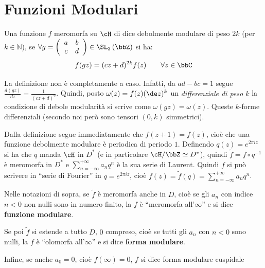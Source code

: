 \section{Funzioni Modulari}
\begin{definizione}
Una funzione $f$ meromorfa su $\cH$ di dice debolmente modulare di peso $2k$ (per $k \in \mathbb{N}$), se $\forall g =
\left( \begin{array}{cc} a & b \\ c & d \end{array} \right) \in
\SL_2 \left( \bbZ \right)$ si ha:
	\[
		f(g z) = (c z + d)^{2 k} f(z)
		\qquad \forall z \in \bbC
	\]
\end{definizione}

\begin{osservazione}
	La definizione non è completamente a caso. Infatti, da $a d - bc = 1$ segue $\displaystyle{\frac{d(gz)}{dz} = \frac{1}{(cz+d)^2}}$. Quindi, posto $\omega(z) = f(z)(\de z)^k$ un \emph{differenziale di peso $k$} la condizione di debole modularità si scrive come $\omega(g z) = \omega(z)$. Queste $k$-forme differenziali (secondo noi però sono tensori $(0, k)$ simmetrici).
\end{osservazione}

\begin{osservazione}
Dalla definizione segue immediatamente che $f(z+1)=f(z)$, cioè che una
funzione debolmente modulare è periodica di periodo $1$. Definendo $q(z) = e^{2 \pi i z}$
si ha che $q$ manda $\cH$ in $D^*$ (e in particolare $\cH / \bbZ \simeq D^*$), quindi
$\widetilde{f} = f \circ q^{-1}$ è meromorfa in $D^*$ e
$\displaystyle{\sum^{+\infty}_{n=-\infty}{a_n q^n}}$ è la sua serie di Laurent.
Quindi $f$ si può scrivere in ``serie di Fourier'' in $q=e^{2 \pi i z}$, cioè
$\displaystyle{f(z)=\widetilde{f}(q)=\sum^{+\infty}_{n=-\infty}{a_n q^n}}$.
\end{osservazione}

\begin{definizione}
Nelle notazioni di sopra, se $\widetilde{f}$ è meromorfa anche in $D$, cioè
se gli $a_n$ con indice $n<0$ non nulli sono in numero finito, la $f$
è ``meromorfa all'$\infty$'' e si dice {\bf funzione modulare}.

Se poi $\widetilde{f}$ si estende a tutto $D$, $0$ compreso, cioè se tutti gli $a_n$ con $n < 0$
sono nulli, la $f$ è ``olomorfa all'$\infty$'' e si dice {\bf forma modulare}.

Infine, se anche $a_0 = 0$, cioè $f(\infty) = 0$, $f$ si dice forma modulare
cuspidale
\end{definizione}

